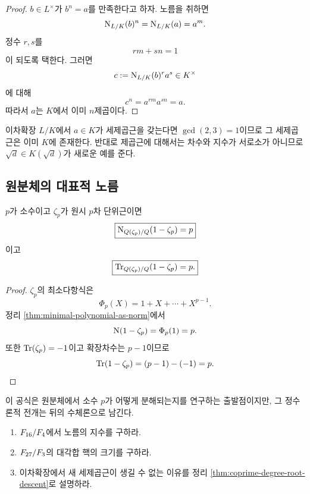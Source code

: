 \begin{proof}
$b\in L^\times$가 $b^n=a$를 만족한다고 하자. 노름을 취하면
\[
  \operatorname{N}_{L/K}(b)^n
  =\operatorname{N}_{L/K}(a)=a^m.
\]
정수 $r,s$를
\[
  rm+sn=1
\]
이 되도록 택한다. 그러면
\[
  c:=\operatorname{N}_{L/K}(b)^r a^s\in K^\times
\]
에 대해
\[
  c^n
  =a^{rm}a^{sn}=a.
\]
따라서 $a$는 $K$에서 이미 $n$제곱이다.
\end{proof}

\begin{example}
이차확장 $L/K$에서 $a\in K$가 세제곱근을 갖는다면
$\gcd(2,3)=1$이므로 그 세제곱근은 이미 $K$에 존재한다.
반대로 제곱근에 대해서는 차수와 지수가 서로소가 아니므로
$\sqrt d\in K(\sqrt d)$가 새로운 예를 준다.
\end{example}

\subsection{원분체의 대표적 노름}

\begin{proposition}
\label{prop:cyclotomic-one-minus-zeta-norm}
$p$가 소수이고 $\zeta_p$가 원시 $p$차 단위근이면
\[
  \boxed{
  \operatorname{N}_{Q(\zeta_p)/Q}(1-\zeta_p)=p}
\]
이고
\[
  \boxed{
  \operatorname{Tr}_{Q(\zeta_p)/Q}(1-\zeta_p)=p.}
\]
\end{proposition}

\begin{proof}
$\zeta_p$의 최소다항식은
\[
  \Phi_p(X)=1+X+\cdots+X^{p-1}.
\]
정리 \ref{thm:minimal-polynomial-as-norm}에서
\[
  \operatorname{N}(1-\zeta_p)=\Phi_p(1)=p.
\]
또한 $\operatorname{Tr}(\zeta_p)=-1$이고 확장차수는 $p-1$이므로
\[
  \operatorname{Tr}(1-\zeta_p)
  =(p-1)-(-1)=p.
\]
\end{proof}

이 공식은 원분체에서 소수 $p$가 어떻게 분해되는지를 연구하는 출발점이지만,
그 정수론적 전개는 뒤의 수체론으로 남긴다.

\begin{checkpoint}
\begin{enumerate}[label=(\alph*)]
  \item $F_{16}/F_4$에서 노름의 지수를 구하라.
  \item $F_{27}/F_3$의 대각합 핵의 크기를 구하라.
  \item 이차확장에서 새 세제곱근이 생길 수 없는 이유를
  정리 \ref{thm:coprime-degree-root-descent}로 설명하라.
\end{enumerate}
\end{checkpoint}
